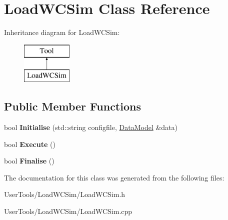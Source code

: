 \hypertarget{classLoadWCSim}{\section{Load\-W\-C\-Sim Class Reference}
\label{classLoadWCSim}
}
Inheritance diagram for Load\-W\-C\-Sim\-:\begin{figure}[H]
\begin{center}
\leavevmode
\includegraphics[height=2.000000cm]{classLoadWCSim}
\end{center}
\end{figure}
\subsection*{Public Member Functions}
\begin{DoxyCompactItemize}
\item 
\hypertarget{classLoadWCSim_a14c9d0f26dc099128ca670bd48b7cd34}{bool {\bfseries Initialise} (std\-::string configfile, \hyperlink{classDataModel}{Data\-Model} \&data)}\label{classLoadWCSim_a14c9d0f26dc099128ca670bd48b7cd34}

\item 
\hypertarget{classLoadWCSim_ae8b696ec0cbd3c0febee1c3482df3f7b}{bool {\bfseries Execute} ()}\label{classLoadWCSim_ae8b696ec0cbd3c0febee1c3482df3f7b}

\item 
\hypertarget{classLoadWCSim_afa581b87ca4db35eeb17bab6f40d169f}{bool {\bfseries Finalise} ()}\label{classLoadWCSim_afa581b87ca4db35eeb17bab6f40d169f}

\end{DoxyCompactItemize}


The documentation for this class was generated from the following files\-:\begin{DoxyCompactItemize}
\item 
User\-Tools/\-Load\-W\-C\-Sim/Load\-W\-C\-Sim.\-h\item 
User\-Tools/\-Load\-W\-C\-Sim/Load\-W\-C\-Sim.\-cpp\end{DoxyCompactItemize}
